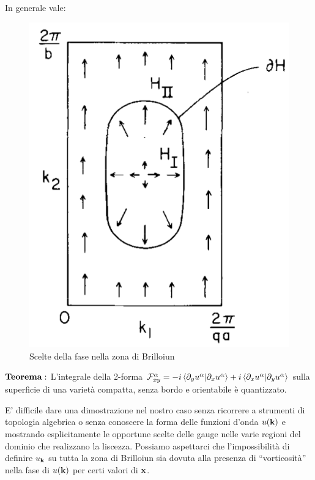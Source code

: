\documentclass[12pt,a4paper]{article}
\begin{document}
In generale vale:
\begin{figure}[!htb]
\centering
\includegraphics[scale=0.6]{immagini/magnetic.png}
\caption{Scelte della fase nella zona di Brilloiun\label{topos}}
\end{figure}

$\bold{Teorema:}$ L'integrale della 2-forma $\mathcal{F}^{\alpha}_{xy} = -i \braket{\partial_{y} u^{\alpha}| \partial_{x} u^{\alpha}} + i  \braket{\partial_{x} u^{\alpha}| \partial_{y} u^{\alpha}}$ sulla superficie di una varietà compatta, senza bordo e orientabile è quantizzato.

E' difficile dare una dimostrazione nel nostro caso senza ricorrere a strumenti di topologia algebrica o senza conoscere la forma delle funzioni d'onda $u(\bold{k})$ e mostrando esplicitamente le opportune scelte delle gauge nelle varie regioni del dominio che realizzano la liscezza.
Possiamo aspettarci che l'impossibilità di definire $u_{\bold{k}}$ su tutta la zona di Brilloiun sia dovuta alla presenza di  ``vorticosità'' nella fase di $u(\bold{k})$ per certi valori di $\bold{x}$.
\end{document}
